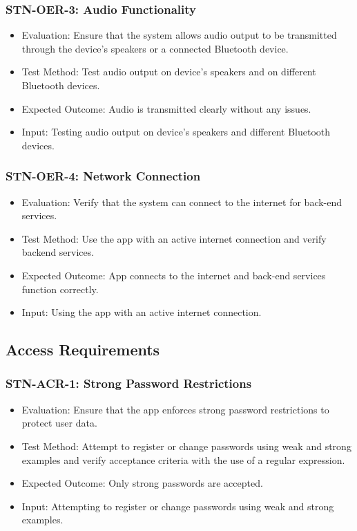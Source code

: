 \documentclass[12pt, titlepage]{article}
\begin{document}
\subsubsection{STN-OER-3: Audio Functionality}
\begin{itemize}
    \item Evaluation: Ensure that the system allows audio output to be transmitted through the device's speakers or a connected Bluetooth device.
    \item Test Method: Test audio output on device's speakers and on different Bluetooth devices.
    \item Expected Outcome: Audio is transmitted clearly without any issues.
    \item Input: Testing audio output on device's speakers and different Bluetooth devices.
\end{itemize}

\subsubsection{STN-OER-4: Network Connection}
\begin{itemize}
    \item Evaluation: Verify that the system can connect to the internet for back-end services.
    \item Test Method: Use the app with an active internet connection and verify backend services.
    \item Expected Outcome: App connects to the internet and back-end services function correctly.
    \item Input: Using the app with an active internet connection.
\end{itemize}

\subsection{Access Requirements}

\subsubsection{STN-ACR-1: Strong Password Restrictions}
\begin{itemize}
    \item Evaluation: Ensure that the app enforces strong password restrictions to protect user data.
    \item Test Method: Attempt to register or change passwords using weak and strong examples and verify acceptance criteria with the use of a regular expression.
    \item Expected Outcome: Only strong passwords are accepted.
    \item Input: Attempting to register or change passwords using weak and strong examples.
\end{itemize}
\end{document}
